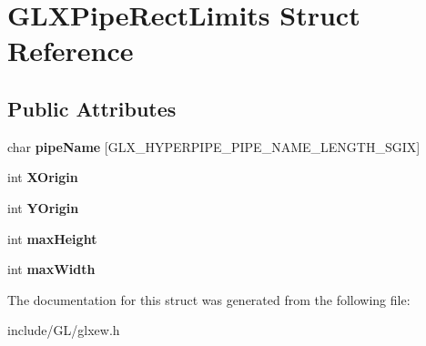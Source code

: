 \hypertarget{structGLXPipeRectLimits}{}\section{G\+L\+X\+Pipe\+Rect\+Limits Struct Reference}
\label{structGLXPipeRectLimits}
\subsection*{Public Attributes}
\begin{DoxyCompactItemize}
\item 
\mbox{\label{structGLXPipeRectLimits_ae78b4b6656101bc841946733a5b6e5ce}} 
char {\bfseries pipe\+Name} \mbox{[}G\+L\+X\+\_\+\+H\+Y\+P\+E\+R\+P\+I\+P\+E\+\_\+\+P\+I\+P\+E\+\_\+\+N\+A\+M\+E\+\_\+\+L\+E\+N\+G\+T\+H\+\_\+\+S\+G\+IX\mbox{]}
\item 
\mbox{\label{structGLXPipeRectLimits_a3e5a965059d9f5d2ca42acd35af5bb9b}} 
int {\bfseries X\+Origin}
\item 
\mbox{\label{structGLXPipeRectLimits_a50e06bcf0dae95854be7d93a515199e9}} 
int {\bfseries Y\+Origin}
\item 
\mbox{\label{structGLXPipeRectLimits_a27572e499c0d3280031c2ad8e387c0c1}} 
int {\bfseries max\+Height}
\item 
\mbox{\label{structGLXPipeRectLimits_a8662c7a712b30620e25fc994adf337a1}} 
int {\bfseries max\+Width}
\end{DoxyCompactItemize}


The documentation for this struct was generated from the following file\+:\begin{DoxyCompactItemize}
\item 
include/\+G\+L/glxew.\+h\end{DoxyCompactItemize}
